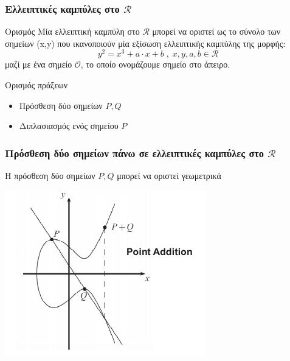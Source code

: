 \documentclass{beamer}
\begin{document}
\begin{frame}
\frametitle{Ελλειπτικές καμπύλες στο $\mathcal{R}$}
\begin{block}
{Ορισμός}
Μία ελλειπτική καμπύλη στο $\mathcal{R}$ μπορεί να οριστεί ως το σύνολο των σημείων (x,y) που ικανοποιούν μία εξίσωση ελλειπτικής καμπύλης της μορφής: 
$$y^2 = x^3 + a \cdot x + b \; , \; x,y,a,b \in \mathcal{R}$$
μαζί με ένα σημείο $\mathcal{O}$, το οποίο ονομάζουμε σημείο στο άπειρο.
\end{block}
\begin{block}
{Ορισμός πράξεων}
\begin{itemize}
\item Πρόσθεση δύο σημείων $P,Q$
\item Διπλασιασμός ενός σημείου $P$
\end{itemize}
\end{block}
\end{frame}


%
\begin{frame}
\frametitle{Πρόσθεση δύο σημείων πάνω σε ελλειπτικές καμπύλες στο $\mathcal{R}$}
H πρόσθεση δύο σημείων $P, Q$ μπορεί να οριστεί γεωμετρικά
\begin{center}
\includegraphics[scale=0.5]{add.png}

\end{center}\end{frame}
\end{document}
